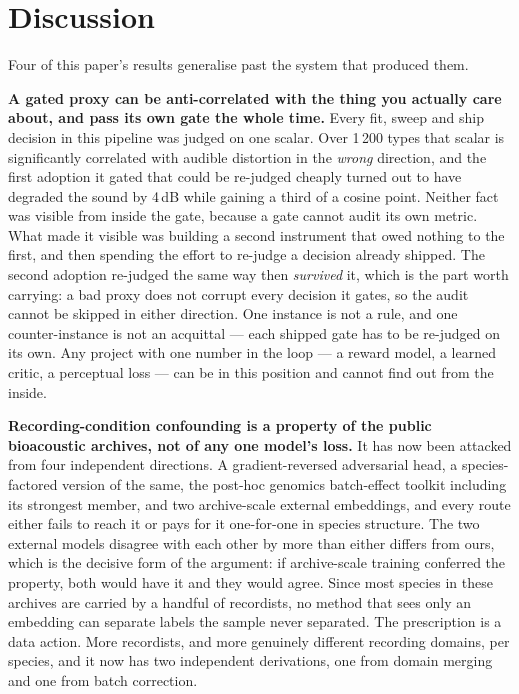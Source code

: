 \documentclass[10pt,twocolumn,a4paper]{article}
\begin{document}
\section{Discussion}
\label{sec:discussion}

Four of this paper's results generalise past the system that produced them.

\textbf{A gated proxy can be anti-correlated with the thing you actually care about, and pass
its own gate the whole time.} Every fit, sweep and ship decision in this pipeline was judged on
one scalar. Over 1\,200 types that scalar is significantly correlated with audible distortion in
the \emph{wrong} direction, and the first adoption it gated that could be re-judged cheaply turned
out to have degraded the sound by 4\,dB while gaining a third of a cosine point. Neither fact was
visible from inside the gate, because a gate cannot audit its own metric. What made it visible
was building a second instrument that owed nothing to the first, and then spending the effort to
re-judge a decision already shipped. The second adoption re-judged the same way then
\emph{survived} it, which is the part worth carrying: a bad proxy does not corrupt every decision
it gates, so the audit cannot be skipped in either direction. One instance is not a rule, and one
counter-instance is not an acquittal --- each shipped gate has to be re-judged on its own. Any project with one number in the loop --- a reward model,
a learned critic, a perceptual loss --- can be in this position and cannot find out from the
inside.

\textbf{Recording-condition confounding is a property of the public bioacoustic archives, not
of any one model's loss.} It has now been attacked from four independent directions. A
gradient-reversed adversarial head, a species-factored version of the same, the post-hoc
genomics batch-effect toolkit including its strongest member, and two archive-scale external
embeddings, and every route either fails to reach it or pays for it one-for-one in species
structure. The two external models disagree with each other by more than either differs from
ours, which is the decisive form of the argument: if archive-scale training conferred the
property, both would have it and they would agree. Since most species in these archives are
carried by a handful of recordists, no method that sees only an embedding can separate labels
the sample never separated. The prescription is a data action. More recordists, and more
genuinely different recording domains, per species, and it now has two independent
derivations, one from domain merging and one from batch correction.
\end{document}
